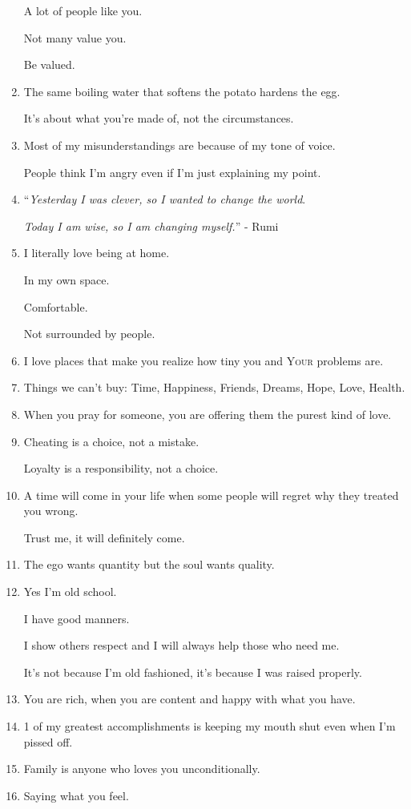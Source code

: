 \documentclass{article}
\begin{document}
\begin{enumerate}
	A lot of people like you.
	
	Not many value you.
	
	Be valued.
	\item The same boiling water that softens the potato hardens the egg.
	
	It's about what you're made of, not the circumstances.
	\item Most of my misunderstandings are because of my tone of voice.
	
	People think I'm angry even if I'm just explaining my point.
	\item ``\textit{Yesterday I was clever, so I wanted to change the world}.
	
	\textit{Today I am wise, so I am changing myself.}'' - Rumi
	\item I literally love being at home.
	
	In my own space.
	
	Comfortable.
	
	Not surrounded by people.
	\item I love places that make you realize how tiny you and \textsc{Your} problems are.
	\item Things we can't buy: Time, Happiness, Friends, Dreams, Hope, Love, Health.
	\item When you pray for someone, you are offering them the purest kind of love.
	\item Cheating is a choice, not a mistake.
	
	Loyalty is a responsibility, not a choice.
	\item A time will come in your life when some people will regret why they treated you wrong.
	
	Trust me, it will definitely come.
	\item The ego wants quantity but the soul wants quality.
	\item Yes I'm old school.
	
	I have good manners.
	
	I show others respect and I will always help those who need me.
	
	It's not because I'm old fashioned, it's because I was raised properly.
	\item You are rich, when you are content and happy with what you have.
	\item 1 of my greatest accomplishments is keeping my mouth shut even when I'm pissed off.
	\item Family is anyone who loves you unconditionally.
	\item Saying what you feel.
	

\end{enumerate}
\end{document}
